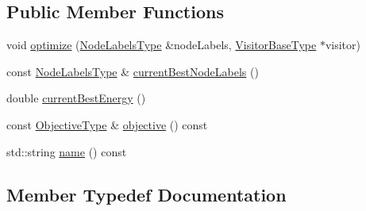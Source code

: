 \subsection*{Public Member Functions}
\begin{DoxyCompactItemize}
\item 
void \hyperlink{classnifty_1_1graph_1_1opt_1_1lifted__multicut_1_1PyLiftedMulticutBase_af964f40577302eda71f68ba080d4e0f0}{optimize} (\hyperlink{classnifty_1_1graph_1_1opt_1_1lifted__multicut_1_1PyLiftedMulticutBase_afeaa6139205af7449872174c68de2b57}{Node\+Labels\+Type} \&node\+Labels, \hyperlink{classnifty_1_1graph_1_1opt_1_1lifted__multicut_1_1PyLiftedMulticutBase_ac5e5eff52536f20200ad9004bea80998}{Visitor\+Base\+Type} $\ast$visitor)
\item 
const \hyperlink{classnifty_1_1graph_1_1opt_1_1lifted__multicut_1_1PyLiftedMulticutBase_afeaa6139205af7449872174c68de2b57}{Node\+Labels\+Type} \& \hyperlink{classnifty_1_1graph_1_1opt_1_1lifted__multicut_1_1PyLiftedMulticutBase_aca1f542bc5ea97e60398b90db0630626}{current\+Best\+Node\+Labels} ()
\item 
double \hyperlink{classnifty_1_1graph_1_1opt_1_1lifted__multicut_1_1PyLiftedMulticutBase_a6d178e143ed30594ac6253e10da4e117}{current\+Best\+Energy} ()
\item 
const \hyperlink{classnifty_1_1graph_1_1opt_1_1lifted__multicut_1_1PyLiftedMulticutBase_a2e2f37a21bb3b5e986e130287bcdeede}{Objective\+Type} \& \hyperlink{classnifty_1_1graph_1_1opt_1_1lifted__multicut_1_1PyLiftedMulticutBase_a5b0b0d349671f7545de66b340d1ca6e2}{objective} () const
\item 
std\+::string \hyperlink{classnifty_1_1graph_1_1opt_1_1lifted__multicut_1_1PyLiftedMulticutBase_aa9754f9f8128f36e7b5a76c6c6047036}{name} () const
\end{DoxyCompactItemize}


\subsection{Member Typedef Documentation}
\mbox{\label{classnifty_1_1graph_1_1opt_1_1lifted__multicut_1_1PyLiftedMulticutBase_a5e4bcacb959f6be14e4544b8ae228deb}} 
